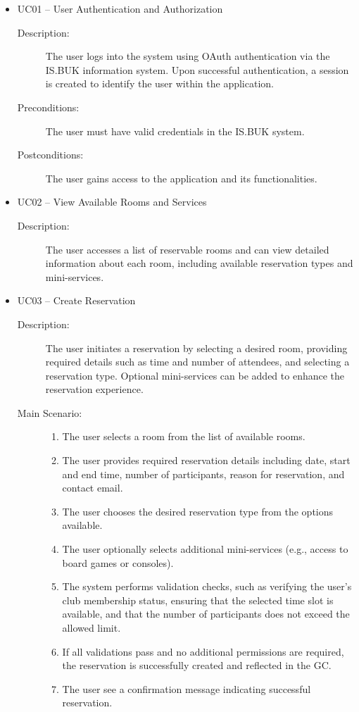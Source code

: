 \begin{itemize}
\item UC01 -- User Authentication and Authorization

\begin{description}
\item [Description:] The user logs into the system using OAuth authentication via the IS.BUK information system. Upon successful authentication, a session is created to identify the user within the application.
\item [Preconditions:] The user must have valid credentials in the IS.BUK system.
\item [Postconditions:] The user gains access to the application and its functionalities.
\end{description}

\item UC02 -- View Available Rooms and Services

\begin{description}
\item [Description:] The user accesses a list of reservable rooms and can view detailed information about each room, including available reservation types and mini-services.
\end{description}

\newpage
\item UC03 -- Create Reservation

\begin{description}

  \item [Description:]
  The user initiates a reservation by selecting a desired room, providing required details such as time and number of attendees, and selecting a reservation type. Optional mini-services can be added to enhance the reservation experience.
  
  \item [Main Scenario:] \mbox{}%
  \begin{enumerate}
  \item The user selects a room from the list of available rooms.
  \item The user provides required reservation details including date, start and end time, number of participants, reason for reservation, and contact email.
  \item The user chooses the desired reservation type from the options available.
  \item The user optionally selects additional mini-services (e.g., access to board games or consoles).
  \item The system performs validation checks, such as verifying the user’s club membership status, ensuring that the selected time slot is available, and that the number of participants does not exceed the allowed limit.
  \item If all validations pass and no additional permissions are required, the reservation is successfully created and reflected in the GC.
  \item The user see a confirmation message indicating successful reservation.
  \end{enumerate}
  

\end{description}
\end{itemize}
